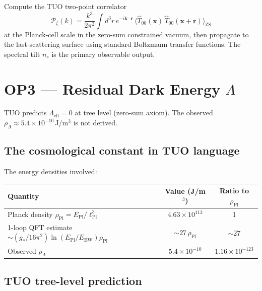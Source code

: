 \documentclass[12pt,a4paper]{article}
\theoremstyle{remark}
\newcommand{\EPl}{E_{\mathrm{Pl}}}
\newcommand{\lPl}{\ell_{\mathrm{Pl}}}
\newcommand{\gstar}{g_{*}}
\begin{document}
\begin{tcolorbox}[openbox,title={What closes OP2}]
Compute the TUO two-point correlator
\[
  \mathcal{P}_\zeta(k) = \frac{k^3}{2\pi^2}
  \int d^3r\, e^{-i\mathbf{k}\cdot\mathbf{r}}\,
  \bigl\langle \hat{T}_{00}(\mathbf{x})\,\hat{T}_{00}(\mathbf{x}+\mathbf{r}) \bigr\rangle_\mathrm{ZS}
\]
at the Planck-cell scale in the zero-sum constrained vacuum, then
propagate to the last-scattering surface using standard Boltzmann
transfer functions.
The spectral tilt $n_s$ is the primary observable output.
\end{tcolorbox}

\section{OP3 --- Residual Dark Energy $\Lambda$}
\label{sec:op3}

\begin{tcolorbox}[opbox,title={Open Problem 3}]
TUO predicts $\Lambda_\mathrm{eff}=0$ at tree level (zero-sum axiom).
The observed $\rho_\Lambda \approx 5.4\times10^{-10}$\,J/m$^3$ is not derived.
\end{tcolorbox}

\subsection{The cosmological constant in TUO language}

The energy densities involved:
\begin{center}
\begin{tabular}{lcc}
\toprule
Quantity & Value (J/m$^3$) & Ratio to $\rho_\mathrm{Pl}$ \\
\midrule
Planck density $\rho_\mathrm{Pl} = \EPl/\lPl^3$ & $4.63\times10^{113}$ & 1 \\
1-loop QFT estimate $\sim(\gstar/16\pi^2)\ln(E_\mathrm{Pl}/E_\mathrm{EW})\rho_\mathrm{Pl}$ & $\sim 27\,\rho_\mathrm{Pl}$ & $\sim 27$ \\
Observed $\rho_\Lambda$ & $5.4\times10^{-10}$ & $1.16\times10^{-123}$ \\
\bottomrule
\end{tabular}
\end{center}

\subsection{TUO tree-level prediction}
\end{document}
